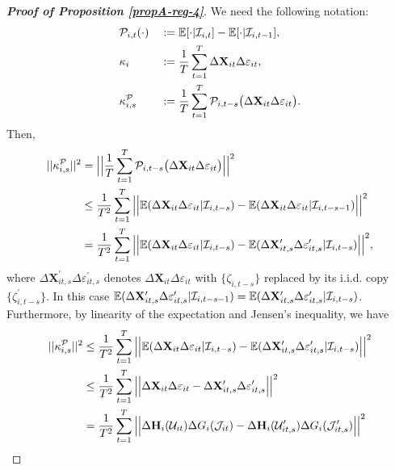 \documentclass[a4paper,12pt]{article}
\begin{document}
\begin{proof}[\textnormal{\textbf{Proof of Proposition \ref{propA-reg-4}}}]
We need the following notation:
\begin{alignat*}{2}
&\mathcal{P}_{i,t}(\cdot) &&:= \mathbb{E}[\cdot|\mathcal{I}_{i, t}] -\mathbb{E}[\cdot|\mathcal{I}_{i, t-1}], \\
&\kappa_{i} && := \frac{1}{T}\sum_{t=1}^T  \Delta \mathbf{X}_{it}\Delta \varepsilon_{it}, \\
&\kappa_{i, s}^{\mathcal{P}} && := \frac{1}{T}\sum_{t=1}^T \mathcal{P}_{i, t-s}\big( \Delta \mathbf{X}_{it}\Delta \varepsilon_{it}\big).
\end{alignat*}
Then,
\begin{align*}
||\kappa_{i, s}^{\mathcal{P}}||^2 &= \Big|\Big| \frac{1}{T}\sum_{t=1}^T \mathcal{P}_{i, t-s}\big( \Delta \mathbf{X}_{it}\Delta \varepsilon_{it}\big) \Big|\Big|^2 \\
&\leq \frac{1}{T^2} \sum_{t=1}^T \Big|\Big| \mathbb{E} (\Delta \mathbf{X}_{it}\Delta \varepsilon_{it}|\mathcal{I}_{i, t-s}) -\mathbb{E} (\Delta \mathbf{X}_{it}\Delta \varepsilon_{it}|\mathcal{I}_{i, t-s-1}) \Big|\Big|^2 \\
&= \frac{1}{T^2} \sum_{t=1}^T \Big|\Big| \mathbb{E} (\Delta \mathbf{X}_{it}\Delta \varepsilon_{it}|\mathcal{I}_{i, t-s}) -\mathbb{E} (\Delta \mathbf{X}_{it, s}^\prime\Delta \varepsilon_{it, s}^\prime|\mathcal{I}_{i, t-s}) \Big|\Big|^2,
\end{align*}
where $\Delta \mathbf{X}_{it, s}^\prime\Delta \varepsilon_{it, s}^\prime$ denotes $\Delta \mathbf{X}_{it}\Delta \varepsilon_{it}$ with $\{\zeta_{i, t-s}\}$ replaced by its i.i.d. copy $\{\zeta_{i, t-s}^\prime\}$. In this case $\mathbb{E} (\Delta \mathbf{X}_{it, s}^\prime\Delta \varepsilon_{it, s}^\prime|\mathcal{I}_{i, t-s -1}) = \mathbb{E} (\Delta \mathbf{X}_{it, s}^\prime\Delta \varepsilon_{it, s}^\prime|\mathcal{I}_{i, t-s})$. Furthermore, by linearity of the expectation and Jensen's inequality, we have 
\begin{align*}
||\kappa_{i, s}^{\mathcal{P}}||^2 &\leq \frac{1}{T^2} \sum_{t=1}^T \Big|\Big| \ex (\Delta \mathbf{X}_{it}\Delta \varepsilon_{it}|\mathcal{I}_{i, t-s}) -\ex (\Delta \mathbf{X}_{it, s}^\prime\Delta \varepsilon_{it, s}^\prime|\mathcal{I}_{i, t-s}) \Big|\Big|^2 \\
&\leq \frac{1}{T^2} \sum_{t=1}^T \Big|\Big| \Delta \mathbf{X}_{it}\Delta \varepsilon_{it} -\Delta \mathbf{X}_{it, s}^\prime\Delta \varepsilon_{it, s}^\prime\Big|\Big|^2 \\
& = \frac{1}{T^2} \sum_{t=1}^T \Big|\Big| \Delta \mathbf{H}_i(\mathcal{U}_{it})  \Delta G_i(\mathcal{J}_{it}) - \Delta \mathbf{H}_i(\mathcal{U}_{it, s}^\prime)  \Delta G_i(\mathcal{J}_{it, s}^\prime)\Big|\Big|^2\\

\end{align*}
\end{proof}
\end{document}
